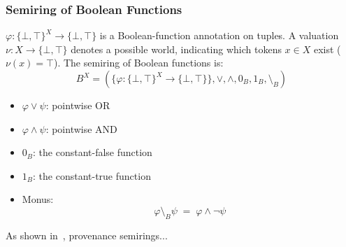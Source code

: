 \documentclass[10pt,a4paper]{scrartcl}
\theoremstyle{definition}
\theoremstyle{remark}
\begin{document}
\subsubsection{Semiring of Boolean Functions}

\(\varphi\colon \{\bot,\top\}^X \to \{\bot,\top\}\) is a Boolean-function annotation on tuples.
A valuation \(\nu\colon X \to \{\bot,\top\}\) denotes a possible world,
  indicating which tokens \(x\in X\) exist (\(\nu(x)=\top\)).
The semiring of Boolean functions is:
$$
B^X = (\{\varphi : \{ \bot,\top \}^X \to \{\bot,\top\}\},\vee,\wedge,0_B,1_B,\setminus_B)
$$
\begin{itemize}
    \item \(\varphi \vee \psi\): pointwise OR
    \item \(\varphi \wedge \psi\): pointwise AND
    \item \(0_B\): the constant-false function
    \item \(1_B\): the constant-true function
    \item Monus:
        $$
        \varphi \setminus_B \psi \;=\; \varphi \wedge \neg \psi
        $$
\end{itemize}



As shown in~\cite{amsterdamer2011provenance}, provenance semirings...



\end{document}
